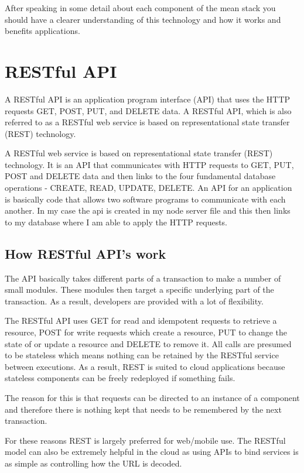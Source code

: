 After speaking in some detail about each component of the mean stack you should have a clearer understanding of this technology and how it works and benefits applications.  


\section{RESTful API}
A RESTful API is an application program interface (API) that uses the HTTP requests GET, POST, PUT, and DELETE data. A RESTful API, which is also referred to as a RESTful web service is based on representational state transfer (REST) technology\cite{Restapi}. 

A RESTful web service is based on representational state transfer (REST) technology. It is an API that communicates with HTTP requests to GET, PUT, POST and DELETE data and then links to the four fundamental database operations - CREATE, READ, UPDATE, DELETE. An API for an application is basically code that allows two software programs to communicate with each another. In my case the api is created in my node server file and this then links to my database where I am able to apply the HTTP requests. 

\subsection {How RESTful API's work}

The API basically takes different parts of a transaction to make a number of small modules. These modules then target a specific underlying part of the transaction. As a result, developers are provided with a lot of flexibility.

The RESTful API uses GET for read and idempotent requests to retrieve a resource,  POST for write requests which create a resource, PUT to change the state of or update a resource and DELETE to remove it. All calls are presumed to be stateless which means nothing can be retained by the RESTful service between executions. As a result,  REST is suited to cloud applications because stateless components can be freely redeployed if something fails. \cite{RESTful}

The reason for this is that requests can be directed to an instance of a component and therefore there is nothing kept that needs to be remembered by the next transaction.

For these reasons REST is largely preferred for web/mobile use. The RESTful model can also be extremely helpful in the cloud as using APIs to bind services is as simple as controlling how the URL is decoded. 

